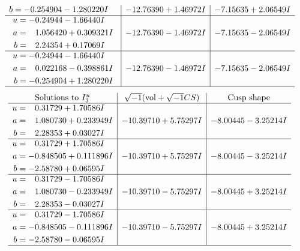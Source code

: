 \documentclass[1p]{elsarticle_modified}
\theoremstyle{definition}
\newcommand{\I}{\sqrt{-1}}
\begin{document}
$$\begin{array}{c|c|c}
\begin{aligned}
b &= -0.254904 - 1.280220 I\end{aligned}
 & -12.76390 + 1.46972 I & -7.15635 + 2.06549 I \\ \hline\begin{aligned}
u &= -0.24944 - 1.66440 I \\
a &= \phantom{-}1.056420 + 0.309321 I \\
b &= \phantom{-}2.24354 + 0.17069 I\end{aligned}
 & -12.76390 - 1.46972 I & -7.15635 - 2.06549 I \\ \hline\begin{aligned}
u &= -0.24944 - 1.66440 I \\
a &= \phantom{-}0.022168 - 0.398861 I \\
b &= -0.254904 + 1.280220 I\end{aligned}
 & -12.76390 - 1.46972 I & -7.15635 - 2.06549 I\\
 \hline 
 \end{array}$$\newpage$$\begin{array}{c|c|c}  
\text{Solutions to }I^u_{3}& \I (\text{vol} + \sqrt{-1}CS) & \text{Cusp shape}\\
 \hline 
\begin{aligned}
u &= \phantom{-}0.31729 + 1.70586 I \\
a &= \phantom{-}1.080730 + 0.233949 I \\
b &= \phantom{-}2.28353 + 0.03027 I\end{aligned}
 & -10.39710 + 5.75297 I & -8.00445 - 3.25214 I \\ \hline\begin{aligned}
u &= \phantom{-}0.31729 + 1.70586 I \\
a &= -0.848505 + 0.111896 I \\
b &= -2.58780 + 0.06595 I\end{aligned}
 & -10.39710 + 5.75297 I & -8.00445 - 3.25214 I \\ \hline\begin{aligned}
u &= \phantom{-}0.31729 - 1.70586 I \\
a &= \phantom{-}1.080730 - 0.233949 I \\
b &= \phantom{-}2.28353 - 0.03027 I\end{aligned}
 & -10.39710 - 5.75297 I & -8.00445 + 3.25214 I \\ \hline\begin{aligned}
u &= \phantom{-}0.31729 - 1.70586 I \\
a &= -0.848505 - 0.111896 I \\
b &= -2.58780 - 0.06595 I\end{aligned}
 & -10.39710 - 5.75297 I & -8.00445 + 3.25214 I\\
 \hline 
 \end{array}$$\newpage\newpage\renewcommand{\arraystretch}{1}
\end{document}
